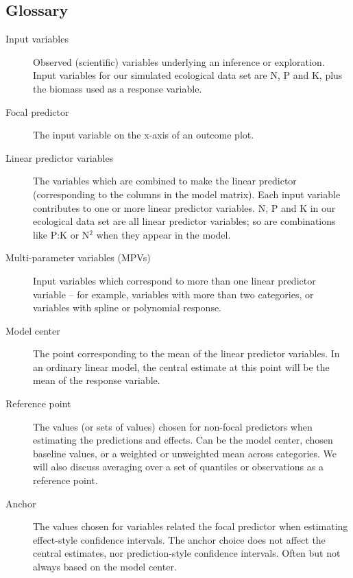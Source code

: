 \begin{gloss}
\subsection*{Glossary}
\begin{description}
\item [Input variables] Observed (scientific) variables underlying an inference or exploration. Input variables for our simulated ecological data set are N, P and K, plus the biomass used as a response variable.

\item [Focal predictor] The input variable on the x-axis of an outcome plot.

\item [Linear predictor variables] The variables which are combined to make the linear predictor (corresponding to the columns in the model matrix). Each input variable contributes to one or more linear predictor variables. N, P and K in our ecological data set are all linear predictor variables; so are combinations like P:K or N$\mbox{}^2$ when they appear in the model.

\item[Multi-parameter variables (MPVs)] Input variables which correspond to more than one linear predictor variable -- for example, variables with more than two categories, or variables with spline or polynomial response. 

\item [Model center] The point corresponding to the mean of the linear predictor variables. In an ordinary linear model, the central estimate at this point will be the mean of the response variable. 

\item [Reference point] The values (or sets of values) chosen for non-focal predictors when estimating the predictions and effects. Can be the model center, chosen baseline values, or a weighted or unweighted mean across categories. We will also discuss averaging over a set of quantiles or observations as a reference point.

\item [Anchor] The values chosen for variables related the focal predictor when estimating effect-style confidence intervals. The anchor choice does not affect the central estimates, nor prediction-style confidence intervals. Often but not always based on the model center. 

\end{description}
\end{gloss}


